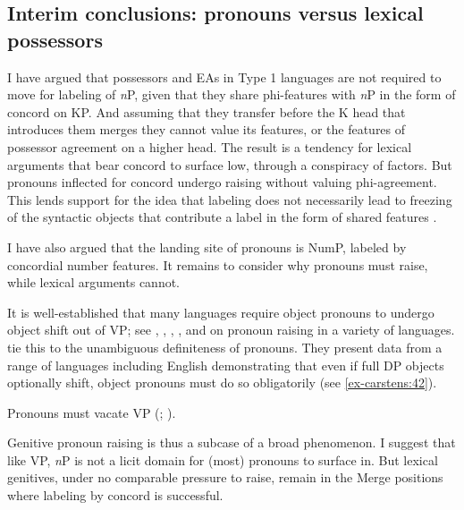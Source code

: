 \documentclass[output=paper
,modfonts
,nonflat]{langsci/langscibook}
\begin{document}
\subsection{Interim conclusions: pronouns versus lexical possessors} \label{sec-carstens:5.4}
I have argued that possessors and EAs in Type 1 languages are not required to move for labeling of \textit{n}P, given that they share phi-features with \textit{n}P in the form of concord on KP. And assuming that they transfer before the K head that introduces them merges they cannot value its features, or the features of possessor agreement on a higher head. The result is a tendency for lexical arguments that bear concord to surface low, through a conspiracy of factors. But pronouns inflected for concord undergo raising without valuing phi-agreement. This lends support for the idea that labeling does not necessarily lead to freezing of the syntactic objects that contribute a label in the form of shared features \citep{Chomsky2015}. 

I have also argued that the landing site of pronouns is NumP, labeled by concordial number features. It remains to consider why pronouns must raise, while lexical arguments cannot. 

It is well-established that many languages require object pronouns to undergo object shift out of VP; see \citet{Diesing1992, Diesing1997}, \citet{Diesing_Jelinek1995}, \citet{Roberts_Shlonsky1996}, \citet{Cardinaletti_Starke1999}, and \citet{Holmberg1999} on pronoun raising in a variety of languages.  \citet{Diesing_Jelinek1995} tie this to the unambiguous definiteness of pronouns. They present data from a range of languages including English demonstrating that even if full DP objects optionally shift, object pronouns must do so obligatorily (see \ref{ex-carstens:42}). 

\begin{exe}
\ex\label{ex-carstens:42} \xlist
{}
\endxlist
\end{exe}
\begin{exe} 
\ex Pronouns must vacate VP (\citealt{Diesing1992, Diesing1997}; \citealt{Diesing_Jelinek1995}).
\end{exe}
Genitive pronoun raising is thus a subcase of a broad phenomenon. I suggest that like VP, \textit{n}P is not a licit domain for (most) pronouns to surface in. But lexical genitives, under no comparable pressure to raise, remain in the Merge positions where labeling by concord is successful. 
\end{document}
